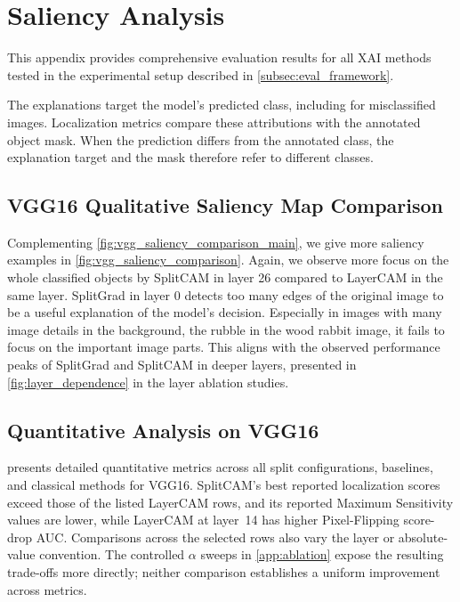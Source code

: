 \newpage

\section{Saliency Analysis} \label{app:saliency}

This appendix provides comprehensive evaluation results for all XAI methods tested in the experimental setup described in \cref{subsec:eval_framework}.

The explanations target the model's predicted class, including for misclassified images.
Localization metrics compare these attributions with the annotated object mask. When the
prediction differs from the annotated class, the explanation target and the mask therefore
refer to different classes.

\subsection{VGG16 Qualitative Saliency Map Comparison} \label{app:vgg_qualitative}

Complementing \cref{fig:vgg_saliency_comparison_main}, we give more saliency examples in \cref{fig:vgg_saliency_comparison}. Again, we observe more focus on the whole classified objects by SplitCAM in layer 26 compared to LayerCAM in the same layer.
SplitGrad in layer 0 detects too many edges of the original image to be a useful explanation of the model's decision. Especially in images with many image details in the background, \eg the rubble in the wood rabbit image, it fails to focus on the important image parts. 
This aligns with the observed performance peaks of SplitGrad and SplitCAM in deeper layers, presented in \cref{fig:layer_dependence} in the layer ablation studies.



\newpage

\subsection{Quantitative Analysis on VGG16} \label{app:vgg_split}

 presents detailed quantitative metrics across all split configurations, baselines, and classical methods for VGG16. SplitCAM's best reported localization scores exceed those of the listed LayerCAM rows, and its reported Maximum Sensitivity values are lower, while LayerCAM at layer~14 has higher Pixel-Flipping score-drop AUC. Comparisons across the selected rows also vary the layer or absolute-value convention. The controlled $\alpha$ sweeps in \cref{app:ablation} expose the resulting trade-offs more directly; neither comparison establishes a uniform improvement across metrics.

